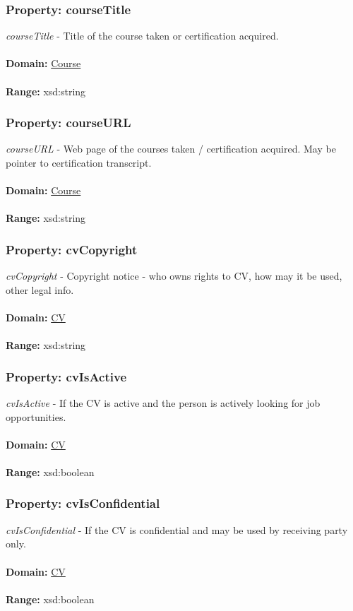 \documentclass[a4paper,12pt]{article}
\numberwithin{equation}{section}
\begin{document}
\subsubsection{Property: courseTitle}\hypertarget{courseTitle}{}
\textit{courseTitle} - Title of the course taken or certification acquired.
\\\\
\textbf{Domain:} \hyperlink{Course}{Course} 
\\\\
\textbf{Range:}  xsd:string

\subsubsection{Property: courseURL}\hypertarget{courseURL}{}
\textit{courseURL} - Web page of the courses taken / certification acquired. May be pointer to certification transcript.
\\\\
\textbf{Domain:} \hyperlink{Course}{Course} 
\\\\
\textbf{Range:}  xsd:string

\subsubsection{Property: cvCopyright}\hypertarget{cvCopyright}{}
\textit{cvCopyright} - Copyright notice - who owns rights to CV, how may it be used, other legal info.
\\\\
\textbf{Domain:} \hyperlink{CV}{CV} 
\\\\
\textbf{Range:}  xsd:string

\subsubsection{Property: cvIsActive}\hypertarget{cvIsActive}{}
\textit{cvIsActive} - If the CV is active and the person is actively looking for job opportunities.
\\\\
\textbf{Domain:} \hyperlink{CV}{CV} 
\\\\
\textbf{Range:}  xsd:boolean

\subsubsection{Property: cvIsConfidential}\hypertarget{cvIsConfidential}{}
\textit{cvIsConfidential} - If the CV is confidential and may be used by receiving party only.
\\\\
\textbf{Domain:} \hyperlink{CV}{CV} 
\\\\
\textbf{Range:}  xsd:boolean
\end{document}
